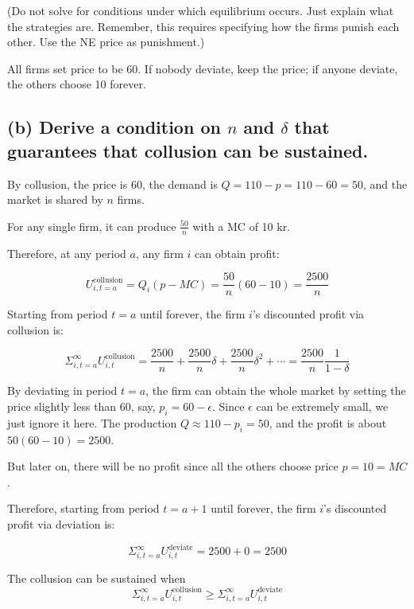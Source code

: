 \documentclass{article}
\begin{document}
\medskip 

(Do not solve for conditions under which equilibrium
occurs. Just explain what the strategies are. Remember, this requires
specifying how the firms punish each other. Use the NE
price as punishment.)

\bigskip

All firms set price to be 60. If nobody deviate, keep the price; if anyone deviate, the others choose 10 forever.

\subsection*{(b) Derive a condition on $n$ and $\delta$ that guarantees that collusion can be sustained.}

By collusion, the price is 60, the demand is $Q = 110 -p = 110- 60 =50$, and the
market is shared by $n$ firms.

\smallskip

For any single firm, it can produce $\frac{50}{n}$ with a MC of 10 kr.

\smallskip

Therefore, at any period $a$, any firm $i$ can obtain profit:


$$U^{\text{collusion}}_{i,t=a} = Q_i (p-MC) = \frac{50}{n}(60-10) = \frac {2500}{n} $$

Starting from period $t=a$ until forever, the firm $i$'s discounted profit via collusion is:

$$\Sigma^{\infty}_{i,t=a} U^{\text{collusion}}_{i,t}= \frac {2500}{n} + \frac {2500}{n} \delta + \frac {2500}{n}\delta^2 + \cdots = \frac {2500}{n} \frac{1}{1-\delta}$$


By deviating in period $t=a$, the firm can obtain the whole market by setting the price slightly less than $60$, say, $p_i = 60 -\epsilon$. Since $\epsilon$ can be extremely small, we just ignore it here. The production $Q \approx 110 - p_i = 50$, and the profit is about $50 (60 -10)=2500$. 

\smallskip

But later on, there will be no profit since all the others choose price $p=10=MC$. 

\smallskip

Therefore, starting from period $t=a+1$ until forever, the firm $i$'s discounted profit via deviation is:

$$\Sigma^{\infty}_{i,t=a} U^{\text{deviate}}_{i,t}= 2500  + 0 =2500$$

The collusion can be sustained when $$\Sigma^{\infty}_{i,t=a} U^{\text{collusion}}_{i,t} \ge \Sigma^{\infty}_{i,t=a} U^{\text{deviate}}_{i,t}$$
\end{document}
